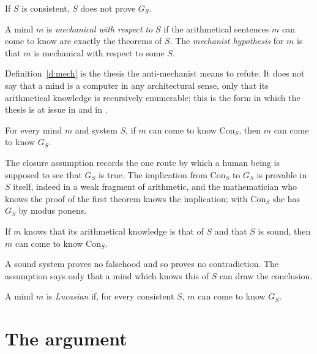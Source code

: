 \documentclass{situationist-preprint}
\begin{document}
\begin{assumption}\label{a:goedel}
If $S$ is consistent, $S$ does not prove $G_S$.
\end{assumption}

\begin{definition}[Mechanism]\label{d:mech}
A mind $m$ is \emph{mechanical with respect to} $S$ if the arithmetical sentences $m$ can come to know are exactly the theorems of $S$. The \emph{mechanist hypothesis} for $m$ is that $m$ is mechanical with respect to some $S$.
\end{definition}

Definition~\ref{d:mech} is the thesis the anti-mechanist means to refute. It does not say that a mind is a computer in any architectural sense, only that its arithmetical knowledge is recursively enumerable; this is the form in which the thesis is at issue in \citet{Lucas1961} and in \citet{Benacerraf1967}.

\begin{assumption}[Closure]\label{a:closure}
For every mind $m$ and system $S$, if $m$ can come to know $\mathrm{Con}_S$, then $m$ can come to know $G_S$.
\end{assumption}

The closure assumption records the one route by which a human being is supposed to see that $G_S$ is true. The implication from $\mathrm{Con}_S$ to $G_S$ is provable in $S$ itself, indeed in a weak fragment of arithmetic, and the mathematician who knows the proof of the first theorem knows the implication; with $\mathrm{Con}_S$ she has $G_S$ by modus ponens.

\begin{assumption}\label{a:penrose}
If $m$ knows that its arithmetical knowledge is that of $S$ and that $S$ is sound, then $m$ can come to know $\mathrm{Con}_S$.
\end{assumption}

A sound system proves no falsehood and so proves no contradiction. The assumption says only that a mind which knows this of $S$ can draw the conclusion.

\begin{definition}\label{d:lucas}
A mind $m$ is \emph{Lucasian} if, for every consistent $S$, $m$ can come to know $G_S$.
\end{definition}

\section{The argument}
\end{document}
